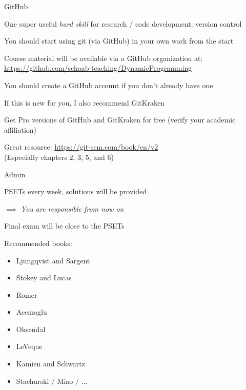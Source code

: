 \documentclass[11pt, aspectratio=169]{beamer}
\newenvironment{witemize}{\itemize\addtolength{\itemsep}{10pt}}{\enditemize}
\begin{document}
\begin{frame}{GitHub}
\begin{witemize}
\item One super useful \textit{hard skill} for research / code development: version control

\item You should start using git (via GitHub) in your own work from the start

\item Course material will be available via a GitHub organization at:
\url{https://github.com/schaab-teaching/DynamicProgramming}

\item You should create a GitHub account if you don't already have one

\item If this is new for you, I also recommend GitKraken

\item Get Pro versions of GitHub and GitKraken for free (verify your academic affiliation)

\item Great resource: \url{https://git-scm.com/book/en/v2} \\
(Especially chapters 2, 3, 5, and 6)

\end{witemize}
\end{frame}


\begin{frame}{Admin}
\begin{witemize}
\item PSETs every week, solutions will be provided

$\implies$ \textit{You are responsible from now on}

\item Final exam will be close to the PSETs

\item Recommended books:
\begin{itemize}
	\item Ljungqvist and Sargent
	\item Stokey and Lucas
	\item Romer
	\item Acemoglu
	\item Oksendal
	\item LeVeque
	\item Kamien and Schwartz
	\item Stachurski / Miao / ...
\end{itemize}
\end{witemize}
\end{frame}
\end{document}
